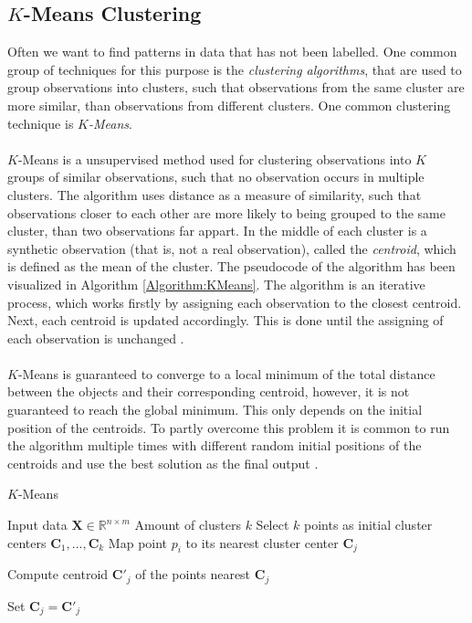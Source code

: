 \documentclass[./main.tex]{subfiles}
\begin{document}
\subsection{$K$-Means Clustering}\label{subsec:K_means}
Often we want to find patterns in data that has not been labelled. One common group of techniques for this purpose is the \textit{clustering algorithms}, that are used to group observations into clusters, such that observations from the same cluster are more similar, than observations from different clusters. One common clustering technique is $K$\textit{-Means}.
\\
\\
$K$-Means is a unsupervised method used for clustering observations into $K$ groups of similar observations, such that no observation occurs in multiple clusters. The algorithm uses distance as a measure of similarity, such that observations closer to each other are more likely to being grouped to the same cluster, than two observations far appart. In the middle of each cluster is a synthetic observation (that is, not a real observation), called the \textit{centroid}, which is defined as the mean of the cluster. The pseudocode of the algorithm has been visualized in Algorithm \ref{Algorithm:KMeans}. The algorithm is an iterative process, which works firstly by assigning each observation to the closest centroid. Next, each centroid is updated accordingly. This is done until the assigning of each observation is unchanged \cite{MAD_book}.
\\
\\
$K$-Means is guaranteed to converge to a local minimum of the total distance between the objects and their corresponding centroid, however, it is not guaranteed to reach the global minimum. This only depends on the initial position of the centroids. To partly overcome this problem it is common to run the algorithm multiple times with different random initial positions of the centroids and use the best solution as the final output \cite{MAD_book}.

\begin{algorithm}[htbp]
    \caption{$K$-Means \cite{DS_manual}}
    \begin{algorithmic}[1]
        \Require Input data $\bm{X} \in \mathbb{R}^{n \times m}$
        \Require Amount of clusters $k$
        \State Select $k$ points as initial cluster centers $\bm{C}_1, ..., \bm{C}_k$
                \State Map point $p_i$ to its nearest cluster center $\bm{C}_j$
            \EndFor

                \State Compute centroid $\bm{C}'_j$ of the points nearest $\bm{C}_j$
            \EndFor

                \State Set $\bm{C}_j = \bm{C}'_j$
            \EndFor
        \EndWhile
    \end{algorithmic}
    \label{Algorithm:KMeans}
\end{algorithm}
\end{document}
